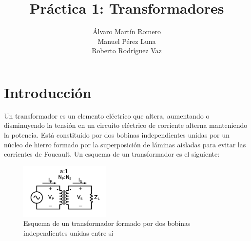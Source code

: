 \documentclass[11pt,letterpaper,twocolumn]{article}
\title{Práctica 1: Transformadores }
\author{Álvaro Martín Romero \\
Manuel Pérez Luna\\
Roberto Rodríguez Vaz}
\begin{document}
\section{Introducción}
\justify
Un transformador es un elemento eléctrico que altera, aumentando o disminuyendo  la tensión en un circuito eléctrico  de corriente alterna manteniendo la  potencia. Está  constituido por dos bobinas independientes unidas por un núcleo  de hierro  formado por la superposición  de láminas  aisladas para evitar  las corrientes de Foucault. Un esquema de un transformador es el siguiente:
\begin{figure}[H]
	\centering
	\includegraphics[width=0.4\textwidth]{transformador.png}
	\caption{Esquema de un transformador formado por dos bobinas independientes unidas entre sí}
	\label{fig:transformador-png}
\end{figure}
\end{document}

